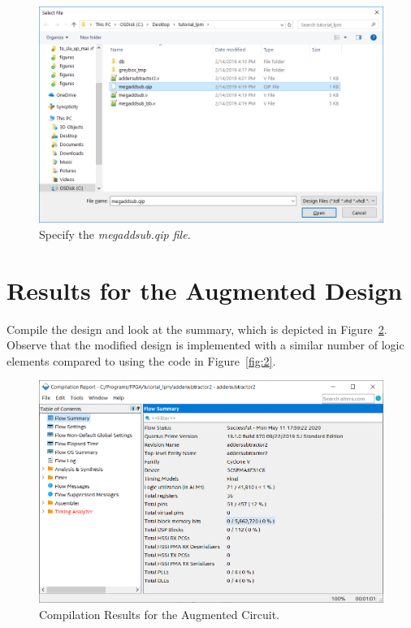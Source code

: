 \documentclass[11pt, twoside, pdftex]{article}
\newcommand{\commonPath}{../../../Common}
\begin{document}
\begin{figure}[H]
   \begin{center}
      \includegraphics[scale=0.5]{figures/figure16.png}
   \caption{Specify the \it{megaddsub.qip} file.} 
	 \label{fig:16}
	 \end{center}
\end{figure} 

\section{Results for the Augmented Design}

Compile the design and look at the summary, which is depicted in Figure~\ref{fig:17}.
Observe that the modified design is implemented with a similar number of logic elements
compared to using the code in Figure~\ref{fig:2}.
 
\begin{figure}[H]
   \begin{center}
      \includegraphics[scale=0.50]{figures/figure17.png}
   \caption{Compilation Results for the Augmented Circuit.} 
	 \label{fig:17}
	 \end{center}
\end{figure} 

 


\end{document}
